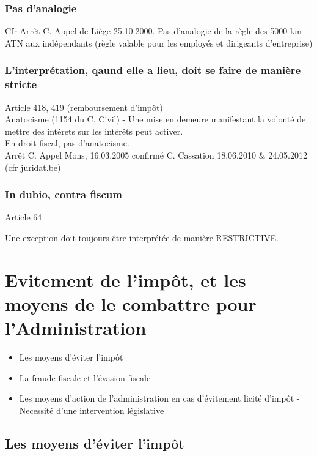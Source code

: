 \documentclass{book}
\begin{document}
   \subsection{Pas d'analogie}
   
   Cfr Arrêt C. Appel de Liège 25.10.2000. Pas d'analogie de la règle des 5000 km ATN aux indépendants (règle valable pour les employés et dirigeants d'entreprise)
   
      \subsection{L'interprétation, qaund elle a lieu, doit se faire de manière stricte}

Article 418, 419 (remboursement d'impôt)\\

Anatocisme (1154 du C. Civil) - Une mise en demeure manifestant la volonté de mettre des intérets sur les intérêts peut activer.\\

En droit fiscal, pas d'anatocisme.\\

Arrêt C. Appel Mons, 16.03.2005 confirmé C. Cassation 18.06.2010 \& 24.05.2012 (cfr juridat.be)

\subsection{In dubio, contra fiscum}    
   
   Article 64
   
   Une exception doit toujours être interprétée de manière RESTRICTIVE. 
   
\chapter{Evitement de l'impôt, et les moyens de le combattre pour l'Administration}
   
\begin{itemize}
\item Les moyens d'éviter l'impôt
\item La fraude fiscale et l'évasion fiscale
\item Les moyens d'action de l'administration en cas d'évitement licité d'impôt - Necessité d'une intervention législative
\end{itemize}


\section{Les moyens d'éviter l'impôt} 
   
\end{document}
